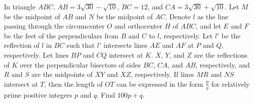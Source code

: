 In triangle $ABC$, $AB=3\sqrt{30}-\sqrt{10}$, $BC=12$, and $CA=3\sqrt{30}+\sqrt{10}$. Let $M$ be the midpoint of $AB$ and $N$ be the midpoint of $AC$. Denote $l$ as the line passing through the circumcenter $O$ and orthocenter $H$ of $ABC$, and let $E$ and $F$ be the feet of the perpendiculars from $B$ and $C$ to $l$, respectively. Let $l'$ be the reflection of $l$ in $BC$ such that $l'$ intersects lines $AE$ and $AF$ at $P$ and $Q$, respectively. Let lines $BP$ and $CQ$ intersect at $K$. $X$, $Y$, and $Z$ are the reflections of $K$ over the perpendicular bisectors of sides $BC$, $CA$, and $AB$, respectively, and $R$ and $S$ are the midpoints of $XY$ and $XZ$, respectively. If lines $MR$ and $NS$ intersect at $T$, then the length of $OT$ can be expressed in the form $\frac{p}{q}$ for relatively prime positive integers $p$ and $q$. Find $100p+q$.
